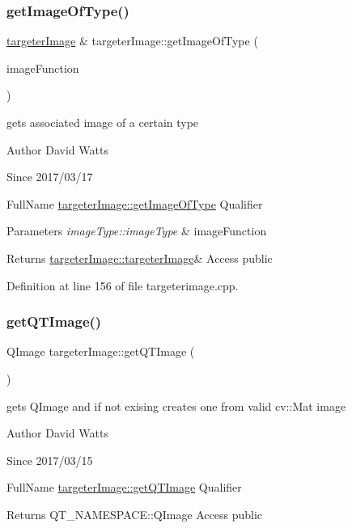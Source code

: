 \subsubsection{\texorpdfstring{get\+Image\+Of\+Type()}{getImageOfType()}}
{\footnotesize\ttfamily \hyperlink{classtargeter_image}{targeter\+Image} \& targeter\+Image\+::get\+Image\+Of\+Type (\begin{DoxyParamCaption}\item[{image\+Type\+::image\+Type}]{image\+Function }\end{DoxyParamCaption})}

gets associated image of a certain type

\begin{DoxyAuthor}{Author}
David Watts 
\end{DoxyAuthor}
\begin{DoxySince}{Since}
2017/03/17
\end{DoxySince}
Full\+Name \hyperlink{classtargeter_image_a92b7c1e3195bc50b112fc67f161b9723}{targeter\+Image\+::get\+Image\+Of\+Type} Qualifier 
\begin{DoxyParams}{Parameters}
{\em image\+Type\+::image\+Type} & image\+Function \\
\hline
\end{DoxyParams}
\begin{DoxyReturn}{Returns}
\hyperlink{classtargeter_image_a2a82f686b73602837e2fb304ce37861d}{targeter\+Image\+::targeter\+Image}\& Access public 
\end{DoxyReturn}


Definition at line 156 of file targeterimage.\+cpp.

\mbox{\label{classtargeter_image_a9c5c783a82afecd73a0b877d3bfdfc01}} 
\subsubsection{\texorpdfstring{get\+Q\+T\+Image()}{getQTImage()}}
{\footnotesize\ttfamily Q\+Image targeter\+Image\+::get\+Q\+T\+Image (\begin{DoxyParamCaption}{ }\end{DoxyParamCaption})}

gets Q\+Image and if not exising creates one from valid cv\+::\+Mat image

\begin{DoxyAuthor}{Author}
David Watts 
\end{DoxyAuthor}
\begin{DoxySince}{Since}
2017/03/15
\end{DoxySince}
Full\+Name \hyperlink{classtargeter_image_a9c5c783a82afecd73a0b877d3bfdfc01}{targeter\+Image\+::get\+Q\+T\+Image} Qualifier \begin{DoxyReturn}{Returns}
Q\+T\+\_\+\+N\+A\+M\+E\+S\+P\+A\+C\+E\+::\+Q\+Image Access public 
\end{DoxyReturn}



